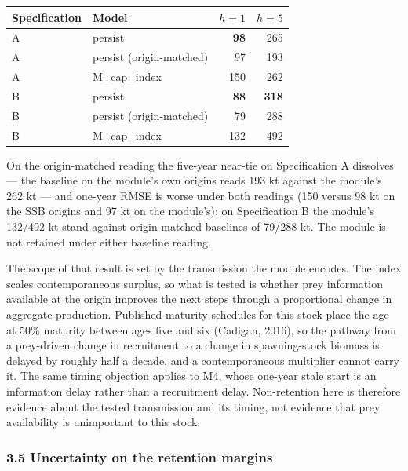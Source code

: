 \documentclass[11pt]{article}
\begin{document}
\begin{longtable}[]{@{}llrr@{}}
\toprule\noalign{}
Specification & Model & \(h=1\) & \(h=5\) \\
\midrule\noalign{}
\endhead
\bottomrule\noalign{}
\endlastfoot
A & persist & \textbf{98} & 265 \\
A & persist (origin-matched) & 97 & 193 \\
A & M\_cap\_index & 150 & 262 \\
B & persist & \textbf{88} & \textbf{318} \\
B & persist (origin-matched) & 79 & 288 \\
B & M\_cap\_index & 132 & 492 \\
\end{longtable}

On the origin-matched reading the five-year near-tie on Specification A
dissolves --- the baseline on the module's own origins reads 193 kt
against the module's 262 kt --- and one-year RMSE is worse under both
readings (150 versus 98 kt on the SSB origins and 97 kt on the
module's); on Specification B the module's 132/492 kt stand against
origin-matched baselines of 79/288 kt. The module is not retained under
either baseline reading.

The scope of that result is set by the transmission the module encodes.
The index scales contemporaneous surplus, so what is tested is whether
prey information available at the origin improves the next steps through
a proportional change in aggregate production. Published maturity
schedules for this stock place the age at 50\% maturity between ages
five and six (Cadigan, 2016), so the pathway from a prey-driven change in
recruitment to a change in spawning-stock biomass is delayed by roughly
half a decade, and a contemporaneous multiplier cannot carry it. The same
timing objection applies to M4, whose one-year stale start is an
information delay rather than a recruitment delay. Non-retention here is
therefore evidence about the tested transmission and its timing, not
evidence that prey availability is unimportant to this stock.

\subsubsection{3.5 Uncertainty on the retention
margins}\label{uncertainty-on-the-retention-margins}
\end{document}
